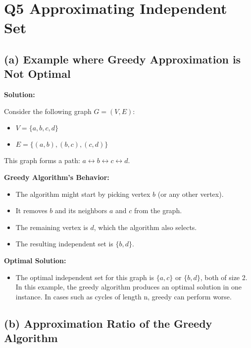 \documentclass[11pt]{article}
\newenvironment{solution}{%
    \par\noindent\textbf{Solution:}\par%
}{\par}
\begin{document}
\newpage

\section*{Q5 Approximating Independent Set}

\subsection*{(a) Example where Greedy Approximation is Not Optimal}

\begin{solution}
Consider the following graph \( G = (V, E) \):
\begin{itemize}
    \item \( V = \{a, b, c, d\} \)
    \item \( E = \{(a, b), (b, c), (c, d)\} \)
\end{itemize}

This graph forms a path: \( a \leftrightarrow b \leftrightarrow c \leftrightarrow d \).

\textbf{Greedy Algorithm's Behavior:}
\begin{itemize}
    \item The algorithm might start by picking vertex \( b \) (or any other vertex).
    \item It removes \( b \) and its neighbors \( a \) and \( c \) from the graph.
    \item The remaining vertex is \( d \), which the algorithm also selects.
    \item The resulting independent set is \( \{b, d\} \).
\end{itemize}

\textbf{Optimal Solution:}
\begin{itemize}
    \item The optimal independent set for this graph is \( \{a, c\} \) or \( \{b, d\} \), both of size 2. In this example, the greedy algorithm produces an optimal solution in one instance. In cases such as cycles of length n, greedy can perform worse.
\end{itemize}
\end{solution}

\subsection*{(b) Approximation Ratio of the Greedy Algorithm}
\end{document}

